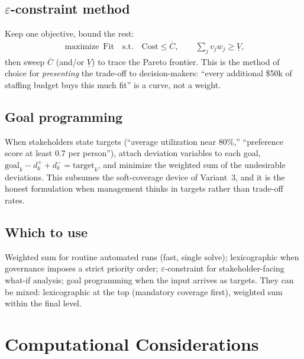 \documentclass[11pt]{article}
\DeclareMathOperator*{\maximize}{maximize}
\theoremstyle{remark}
\begin{document}
\subsection{$\varepsilon$-constraint method}
Keep one objective, bound the rest:
\begin{align}
\maximize \ \mathrm{Fit} \quad \text{s.t.} \quad
\mathrm{Cost} \le \overline{C}, \qquad
\sum_j v_j w_j \ge \underline{V},
\end{align}
then sweep $\overline{C}$ (and/or $\underline{V}$) to trace the Pareto
frontier. This is the method of choice for \emph{presenting} the trade-off
to decision-makers: ``every additional \$50k of staffing budget buys this
much fit'' is a curve, not a weight.

\subsection{Goal programming}
When stakeholders state targets (``average utilization near 80\%,''
``preference score at least 0.7 per person''), attach deviation variables
to each goal, $\mathrm{goal}_k - d^{+}_k + d^{-}_k = \mathrm{target}_k$,
and minimize the weighted sum of the undesirable deviations. This
subsumes the soft-coverage device of Variant~3, and it is the honest
formulation when management thinks in targets rather than trade-off rates.

\subsection{Which to use}
Weighted sum for routine automated runs (fast, single solve); lexicographic
when governance imposes a strict priority order; $\varepsilon$-constraint
for stakeholder-facing what-if analysis; goal programming when the input
arrives as targets. They can be mixed: lexicographic at the top (mandatory
coverage first), weighted sum within the final level.

\section{Computational Considerations}
\end{document}
